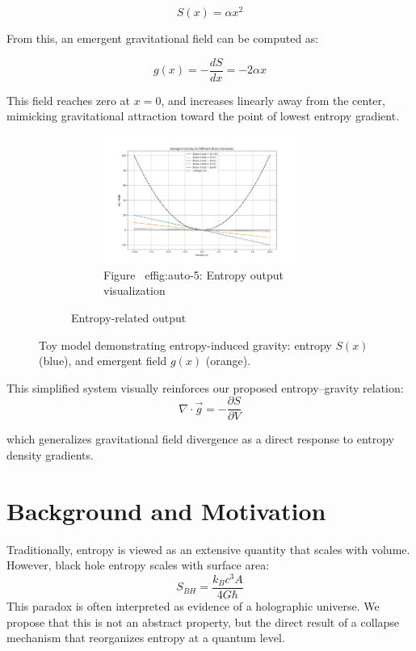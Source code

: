 \documentclass[12pt]{article}
\begin{document}
\[
S(x) = \alpha x^2
\]

From this, an emergent gravitational field can be computed as:

\[
g(x) = -\frac{dS}{dx} = -2\alpha x
\]

This field reaches zero at \( x = 0 \), and increases linearly away from the center, mimicking gravitational attraction toward the point of lowest entropy gradient.

\begin{figure}[H]
    \centering
    \begin{figure}[H]
\centering
\begin{figure}[H]
\centering
\includegraphics[width=0.9\textwidth]{fig_06_toy_model_entropy.png}
\caption{Figure~
ef{fig:auto-5}: Entropy output visualization}
\label{fig:auto-5}
\end{figure}
\caption{Entropy-related output}
\label{fig:Figures_toy_model_plot_png}
\end{figure}

    \caption{Toy model demonstrating entropy-induced gravity: entropy \ensuremath{S(x)} (blue), and emergent field \ensuremath{g(x)} (orange).}
    \label{fig:toy_model_v2}
\end{figure}




This simplified system visually reinforces our proposed entropy–gravity relation:
\[
\nabla \cdot \vec{g} = -\frac{\partial S}{\partial V}
\]

which generalizes gravitational field divergence as a direct response to entropy density gradients.
\section{Background and Motivation}
Traditionally, entropy is viewed as an extensive quantity that scales with volume. However, black hole entropy scales with surface area:
\begin{equation}
S_{BH} = \frac{k_B c^3 A}{4 G \hbar}
\end{equation}
This paradox is often interpreted as evidence of a holographic universe. We propose that this is not an abstract property, but the direct result of a collapse mechanism that reorganizes entropy at a quantum level.
\end{document}

